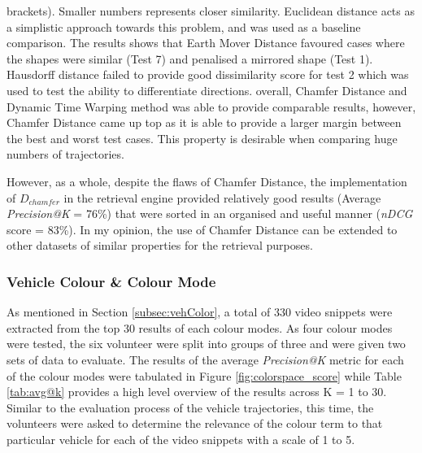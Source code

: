 \begin{landscape}
\begin{table}[]
{  brackets). Smaller numbers represents closer similarity. Euclidean distance
  acts as a simplistic approach towards this problem, and was used as a
  baseline comparison. The results shows that Earth Mover Distance favoured
  cases where the shapes were similar (Test 7) and penalised a mirrored shape
  (Test 1). Hausdorff distance failed to provide good dissimilarity score for
  test 2 which was used to test the ability to differentiate directions.
  overall, Chamfer Distance and Dynamic Time Warping method was able to provide
  comparable results, however, Chamfer Distance came up top as it is able to
  provide a larger margin between the best and worst test cases. This property
  is desirable when comparing huge numbers of trajectories.}
\label{table:DistanceCompare}

\end{table}
\end{landscape}


However, as a whole, despite the flaws of Chamfer Distance, the implementation
of $D_{chamfer}$ in the retrieval engine provided relatively good results
(Average \textit{Precision@K} = 76\%) that were sorted in an organised and
useful manner (\textit{nDCG} score = 83\%). In my opinion, the use of Chamfer
Distance can be extended to other datasets of similar properties for the
retrieval purposes.

\subsubsection{Vehicle Colour \& Colour Mode}
\label{subsec:vehiclecolourchamferdistanceexperiment}

As mentioned in Section \ref{subsec:vehColor}, a total of 330 video snippets
were extracted from the top 30 results of each colour modes.  As four colour
modes were tested, the six volunteer were split into groups of three and were
given two sets of data to evaluate. The results of the average
\textit{Precision@K} metric for each of the colour modes were tabulated in
Figure \ref{fig:colorspace_score} while Table \ref{tab:avg@k} provides a high
level overview of the results across K = 1 to 30. Similar to the evaluation
process of the vehicle trajectories, this time, the volunteers were asked to
determine the relevance of the colour term to that particular vehicle for each
of the video snippets with a scale of 1 to 5.

